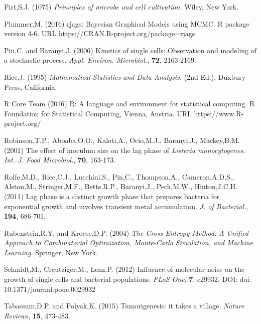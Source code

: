 \documentclass{bioinfo}
\begin{document}
{\begin{thebibliography}{}
Pirt,S.J. (1075) \textit{Principles of microbe and cell cultivation.} Wiley, New York.

Plummer,M. (2016) rjags: Bayesian Graphical Models using MCMC. R package version 4-6. URL https://CRAN.R-project.org/package=rjags

Pin,C. and Baranyi,J. (2006) Kinetics of single cells: Observation and modeling of a stochastic process. {\it Appl. Environ. Microbiol.}, {\bf 72}, 2163-2169. 

 Rice,J. (1995) \textit{Mathematical Statistics and Data Analysis.} (2nd Ed.), Duxbury Press, California.

 R Core Team (2016) R: A language and environment for statistical computing. R
  Foundation for Statistical Computing, Vienna, Austria. URL https://www.R-project.org/

Robinson,T.P., Aboaba,O.O., Kaloti,A., Ocio,M.J., Baranyi,J., Mackey,B.M. (2001) The effect of inoculum size on the lag phase of \textit{Listeria monocytogenes}. {\it Int. J. Food Microbiol.}, {\bf 70}, 163-173. 

Rolfe,M.D., Rice,C.J., Lucchini,S., Pin,C., Thompson,A., Cameron,A.D.S., Alston,M., Stringer,M.F., Betts,R.P., Baranyi,J., Peck,M.W., Hinton,J.C.H. (2011) Lag phase is a distinct growth phase that prepares bacteria for exponential growth and involves transient metal accumulation. {\it J. of Bacteriol.}, {\bf 194}, 686-701. 

Rubenstein,R.Y. and Kroese,D.P. (2004) \textit{The Cross-Entropy Method: A Unified Approach to Combinatorial Optimization, Monte-Carlo Simulation, and Machine Learning.} Springer, New York.  

 Schmidt,M., Creutziger,M., Lenz.P. (2012) Influence of molecular noise on the growth of single cells and bacterial populations. {\it PLoS One}, {\bf 7}, e29932, DOI: doi: 10.1371/journal.pone.0029932


 Tabassum,D.P. and Polyak,K. (2015) Tumorigenesis: it takes a village. {\it Nature Reviews}, {\bf 15}, 473-483.


\end{thebibliography}}
\end{document}
